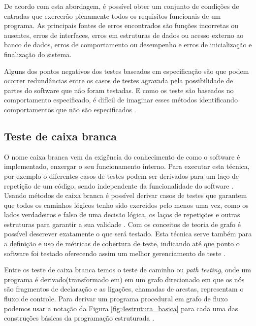 De acordo com \cite{pressman2005software} esta abordagem, é possível obter um conjunto de condições de entradas que exercerão plenamente todos os requisitos funcionais de um programa. As principais fontes de erros encontrados são funções incorretas ou ausentes, erros de interfaces, erros em estruturas de dados ou acesso externo ao banco de dados, erros de comportamento ou desempenho e erros de inicialização e finalização do sistema.

Alguns dos pontos negativos dos testes baseados em especificação são que podem ocorrer redundâncias entre os casos de testes agravada pela possibilidade de partes do software que não foram testadas. E como os teste são baseados no comportamento especificado, é difícil de imaginar esses métodos identificando comportamentos que não são especificados \cite{jorgensen2016software}.

\subsection{Teste de caixa branca}

O nome caixa branca vem da exigência do conhecimento de como o software é implementado, enxergar o seu funcionamento interno. Para executar esta técnica, por exemplo o diferentes casos de testes podem ser derivados para um laço de repetição de um código, sendo independente da funcionalidade do software \cite{graham2008foundations}. Usando métodos de caixa branca é possível derivar casos de testes que garantem que todos os caminhos lógicos tenho sido exercidos pelo menos uma vez, como os lados verdadeiros e falso de uma decisão lógica, os laços de repetições e outras estruturas para garantir a sua validade \cite{pressman2005software}. Com os conceitos de teoria de grafo é possível descrever exatamente o que será testado. Esta técnica serve também para a definição e uso de métricas de cobertura de teste, indicando até que ponto o software foi testado oferecendo assim um melhor gerenciamento de teste \cite{jorgensen2016software}.

Entre os teste de caixa branca temos o teste de caminho ou \textit{path testing}, onde um programa é derivado(transformado em) em um grafo direcionado em que os nós são fragmentos de declaração e as ligações, chamadas de arestas, representam o fluxo de controle. Para derivar um programa procedural em grafo de fluxo podemos usar a notação da Figura \ref{fig:4estrutura_basica} para cada uma das construções básicas da programação estruturada \cite{jorgensen2016software}.

